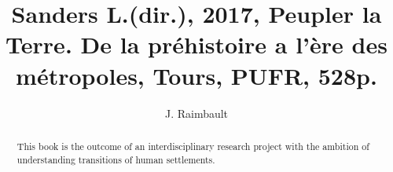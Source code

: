\documentclass[11pt]{article}
\begin{document}
\title{Sanders L.(dir.), 2017, Peupler la Terre. De la préhistoire a l’ère des métropoles, Tours, PUFR,  528p.}

\author{J. Raimbault}

\date{}

\maketitle

\begin{abstract}
	This book is the outcome of an interdisciplinary research project with the ambition of understanding transitions of human settlements.
\end{abstract}




	
	





	


\end{document}
